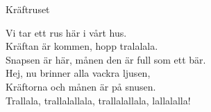 \begin{song}{Kräftruset}
	
	
	
	
	Vi tar ett rus här i vårt hus.\\
	Kräftan är kommen, hopp tralalala.\\
	Snapsen är här, månen den är full som ett bär.\\
	Hej, nu brinner alla vackra ljusen,\\
	Kräftorna och månen är på snusen.\\
	Trallala, trallalallala, trallalallala, lallalalla!
	
\end{song}
